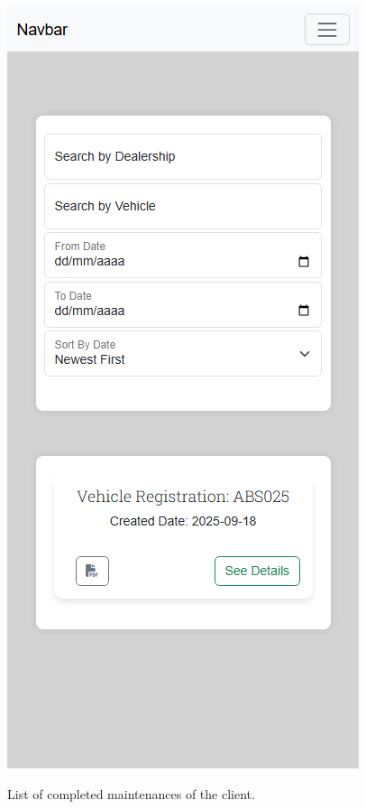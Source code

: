 \begin{figure}[h]
  \caption{List of completed maintenances of the client.}
  \centering
  \includegraphics[width=\textwidth]{figs/Implementation/client/MaintenanceHistory}
  \label{fig:clientMaintenanceHistory}
\end{figure}


